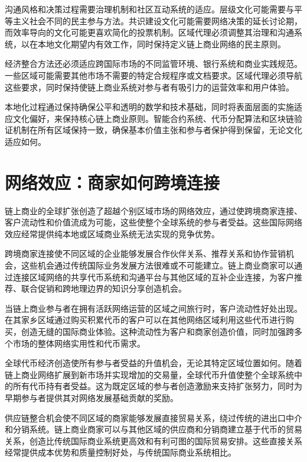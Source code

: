 \documentclass[
  Letterpaper,
]{scrbook}
\begin{document}
沟通风格和决策过程需要治理机制和社区互动系统的适应。层级文化可能需要与平等主义社会不同的民主参与方法。共识建设文化可能需要网络决策的延长讨论期，而效率导向的文化可能更喜欢简化的投票机制。区域代理必须调整其治理和沟通系统，以在本地文化期望内有效工作，同时保持定义链上商业网络的民主原则。

经济整合方法还必须适应跨国际市场的不同监管环境、银行系统和商业实践规范。一些区域可能需要其他市场不需要的特定合规程序或文档要求。区域代理必须导航这些要求，同时保持使链上商业系统对参与者有吸引力的运营效率和用户体验。

本地化过程通过保持确保公平和透明的数学和技术基础，同时将表面层面的实施适应文化偏好，来保持核心链上商业原则。智能合约系统、代币分配算法和区块链验证机制在所有区域保持一致，确保基本价值主张和参与者保护得到保留，无论文化适应如何。

\section{网络效应：商家如何跨境连接}\label{ux7f51ux7edcux6548ux5e94ux5546ux5bb6ux5982ux4f55ux8de8ux5883ux8fdeux63a5}

链上商业的全球扩张创造了超越个别区域市场的网络效应，通过使跨境商家连接、客户流动性和价值流成为可能，这些使整个全球系统的参与者受益。这些国际网络效应经常提供纯本地或区域商业系统无法实现的竞争优势。

跨境商家连接使不同区域的企业能够发展合作伙伴关系、推荐关系和协作营销机会，这些机会通过传统国际业务发展方法很难或不可能建立。链上商业商家可以通过连接区域网络的共享代币系统和沟通平台与其他区域的互补企业连接，为客户推荐、联合促销和跨地理边界的知识分享创造机会。

当链上商业参与者在拥有活跃网络运营的区域之间旅行时，客户流动性好处出现。在其家乡区域通过购买积累代币的客户可以在其他网络区域利用这些代币进行购买，创造无缝的国际商业体验。这种流动性为客户和商家创造价值，同时加强跨多个市场的整体网络实用性和代币需求。

全球代币经济创造使所有参与者受益的升值机会，无论其特定区域位置如何。随着链上商业网络扩展到新市场并实现增加的交易量，全球代币升值使整个全球系统中的所有代币持有者受益。这为既定区域的参与者创造激励来支持扩张努力，同时为早期参与者提供其对网络发展基础贡献的奖励。

供应链整合机会使不同区域的商家能够发展直接贸易关系，绕过传统的进出口中介和分销系统。链上商业商家可以与其他区域的供应商和分销商建立基于代币的贸易关系，创造比传统国际商业系统更高效和有利可图的国际贸易安排。这些直接关系经常提供成本优势和质量控制好处，与传统国际商业系统相比。
\end{document}
